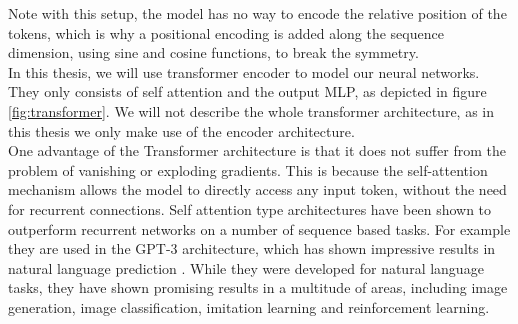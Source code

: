 Note with this setup, the model has no way to encode the relative position of the tokens, which is why a positional encoding is added along the sequence dimension, 
using sine and cosine functions, to break the symmetry.\\ 
In this thesis, we will use transformer encoder to model our neural networks. They only consists of self attention and the output MLP, as depicted in figure \ref{fig:transformer}. 
We will not describe the whole transformer architecture, 
as in this thesis we only make use of the encoder architecture.\\
One advantage of the Transformer architecture is that it does not suffer from the problem of vanishing or exploding gradients.
This is because the self-attention mechanism allows the model to directly access any input token, without the need for recurrent connections. Self attention type 
architectures have been shown to outperform recurrent networks on a number of sequence based tasks. For example they are used in the GPT-3 architecture, which has 
shown impressive results in natural language prediction \cite{brown2020language}. While they were developed for natural language tasks, they have 
shown promising results in a multitude of areas, including image generation, image classification, imitation learning and reinforcement learning.